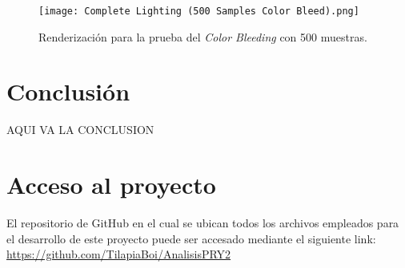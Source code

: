 \documentclass[conference]{IEEEtran}
\begin{document}
\begin{figure}[htbp]
\centerline{\texttt{[image: Complete Lighting (500 Samples Color Bleed).png]}}
\caption{Renderización para la prueba del \textit{Color Bleeding} con 500 muestras.}
\label{500 muestras color bleeding.}
\end{figure}

\section{Conclusión}

AQUI VA LA CONCLUSION

\section{Acceso al proyecto}
El repositorio de GitHub en el cual se ubican todos los archivos empleados para el desarrollo de este proyecto puede ser accesado mediante el siguiente link: \url{https://github.com/TilapiaBoi/AnalisisPRY2}
\end{document}
